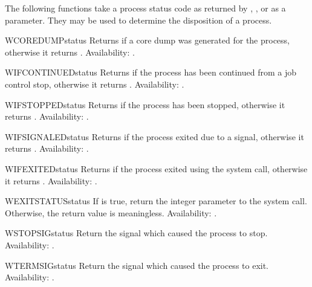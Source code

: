 The following functions take a process status code as returned by
, , or  as a
parameter.  They may be used to determine the disposition of a
process.

\begin{funcdesc}{WCOREDUMP}{status}
Returns  if a core dump was generated for the process,
otherwise it returns .
Availability: \UNIX.
\end{funcdesc}

\begin{funcdesc}{WIFCONTINUED}{status}
Returns  if the process has been continued from a job
control stop, otherwise it returns .
Availability: \UNIX.
\end{funcdesc}

\begin{funcdesc}{WIFSTOPPED}{status}
Returns  if the process has been stopped, otherwise it
returns .
Availability: \UNIX.
\end{funcdesc}

\begin{funcdesc}{WIFSIGNALED}{status}
Returns  if the process exited due to a signal, otherwise
it returns .
Availability: \UNIX.
\end{funcdesc}

\begin{funcdesc}{WIFEXITED}{status}
Returns  if the process exited using the 
system call, otherwise it returns .
Availability: \UNIX.
\end{funcdesc}

\begin{funcdesc}{WEXITSTATUS}{status}
If  is true, return the integer
parameter to the  system call.  Otherwise, the return
value is meaningless.
Availability: \UNIX.
\end{funcdesc}

\begin{funcdesc}{WSTOPSIG}{status}
Return the signal which caused the process to stop.
Availability: \UNIX.
\end{funcdesc}

\begin{funcdesc}{WTERMSIG}{status}
Return the signal which caused the process to exit.
Availability: \UNIX.
\end{funcdesc}


